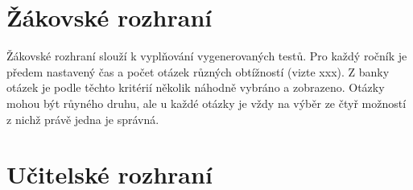 \section{Žákovské rozhraní}

Žákovské rozhraní slouží k vyplňování vygenerovaných testů. Pro každý ročník je předem nastavený čas a počet otázek různých obtížností (vizte xxx). Z banky otázek je podle těchto kritérií několik náhodně vybráno a zobrazeno. Otázky mohou být růyného druhu, ale u každé otázky je vždy na výběr ze čtyř možností z nichž právě jedna je správná. 

\section{Učitelské rozhraní}
\label{sec:admin}
